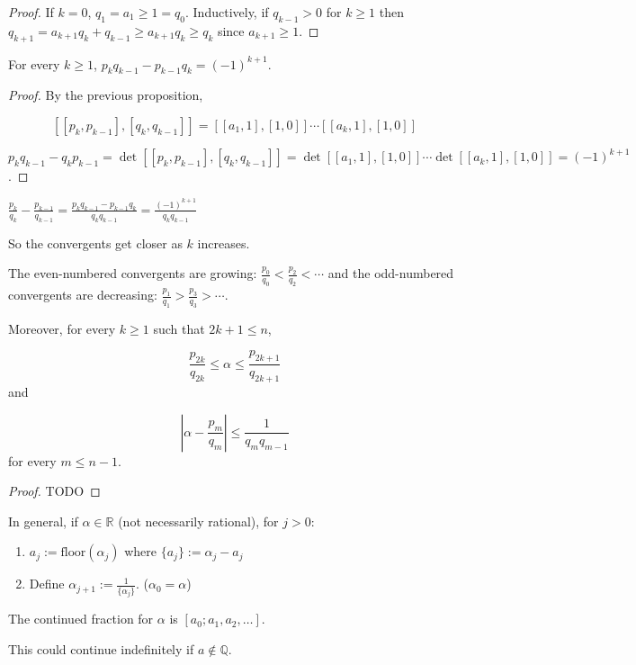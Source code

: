 \begin{proof}
	If $k = 0$, $q_1 = a_1 \ge 1 = q_0$. Inductively, if $q_{k - 1} > 0$ for $k \ge 1$ then $q_{k + 1} = a_{k + 1} q_k + q_{k - 1} \ge a_{k + 1} q_k \ge q_k$ since $a_{k + 1} \ge 1$.
\end{proof}

\begin{lemma}
	For every $k \ge 1$, $p_k q_{k - 1} - p_{k - 1} q_k = {(-1)}^{k + 1}$.
\end{lemma}

\begin{proof}
	By the previous proposition,
	
	\[ [[p_k, p_{k - 1}], [q_k, q_{k - 1}]] = [[a_1, 1], [1, 0]] \cdots [[a_k, 1], [1, 0]] \]
	
	$p_k q_{k - 1} - q_k p_{k - 1} = \det [[p_k, p_{k - 1}], [q_k, q_{k - 1}]] = \det [[a_1, 1], [1, 0]] \cdots \det [[a_k, 1], [1, 0]] = {(-1)}^{k + 1}$.
\end{proof}

\begin{corollary}
	$\frac{p_k}{q_k} - \frac{p_{k - 1}}{q_{k - 1}} = \frac{p_k q_{k - 1} - p_{k - 1} q_k}{q_k q_{k - 1}} = \frac{{(-1)}^{k + 1}}{q_k q_{k - 1}}$

	So the convergents get closer as $k$ increases.
\end{corollary}

\begin{proposition}
	The even-numbered convergents are growing: $\frac{p_0}{q_0} < \frac{p_2}{q_2} < \cdots$ and the odd-numbered convergents are decreasing: $\frac{p_1}{q_1} > \frac{p_3}{q_3} > \cdots$.

	Moreover, for every $k \ge 1$ such that $2k + 1 \le n$,
	
	\[ \frac{p_{2k}}{q_{2k}} \le \alpha \le \frac{p_{2k + 1}}{q_{2k + 1}} \]
	and

	\[ \left| \alpha - \frac{p_m}{q_m} \right| \le \frac{1}{q_m q_{m - 1}} \]
	for every $m \le n - 1$.
\end{proposition}

\begin{proof}
	TODO
\end{proof}

\begin{definition}
	In general, if $\alpha \in \mathbb{R}$ (not necessarily rational), for $j > 0$:
	\begin{enumerate}
		\item $a_j := \text{floor}(\alpha_j)$ where $ \{ a_j \} := \alpha_j - a_j$
		\item Define $\alpha_{j + 1} := \frac{1}{\{\alpha_j\}}$. ($\alpha_0 = \alpha$)
	\end{enumerate}

	The continued fraction for $\alpha$ is $[a_0; a_1, a_2, \ldots]$.

	This could continue indefinitely if $a \notin \mathbb{Q}$.
\end{definition}

